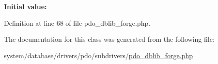 {\bfseries Initial value\+:}
\begin{DoxyCode}{0}
\DoxyCodeLine{        \textcolor{stringliteral}{'TINYINT'}   => \textcolor{stringliteral}{'SMALLINT'},}
\DoxyCodeLine{        \textcolor{stringliteral}{'SMALLINT'}  => \textcolor{stringliteral}{'INT'},}
\DoxyCodeLine{        \textcolor{stringliteral}{'INT'}       => \textcolor{stringliteral}{'BIGINT'},}
\DoxyCodeLine{        \textcolor{stringliteral}{'REAL'}      => \textcolor{stringliteral}{'FLOAT'}}
\DoxyCodeLine{    )}

\end{DoxyCode}


Definition at line 68 of file pdo\+\_\+dblib\+\_\+forge.\+php.



The documentation for this class was generated from the following file\+:\begin{DoxyCompactItemize}
\item 
system/database/drivers/pdo/subdrivers/\mbox{\hyperlink{pdo__dblib__forge_8php}{pdo\+\_\+dblib\+\_\+forge.\+php}}\end{DoxyCompactItemize}
